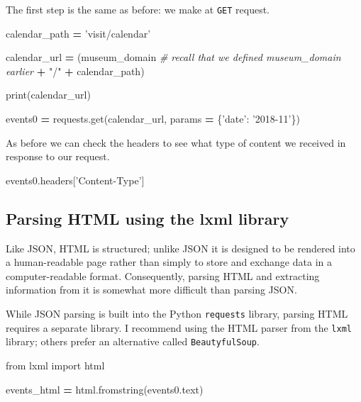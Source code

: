 \documentclass[]{book}
\newenvironment{Shaded}{\begin{snugshade}}{\end{snugshade}}
\newcommand{\StringTok}[1]{\textcolor[rgb]{0.31,0.60,0.02}{#1}}
\newcommand{\ImportTok}[1]{#1}
\newcommand{\CommentTok}[1]{\textcolor[rgb]{0.56,0.35,0.01}{\textit{#1}}}
\newcommand{\OperatorTok}[1]{\textcolor[rgb]{0.81,0.36,0.00}{\textbf{#1}}}
\newcommand{\BuiltInTok}[1]{#1}
\newcommand{\NormalTok}[1]{#1}
\begin{document}
The first step is the same as before: we make at \texttt{GET} request.

\begin{Shaded}
\begin{Highlighting}[]
\NormalTok{calendar_path }\OperatorTok{=} \StringTok{'visit/calendar'}

\NormalTok{calendar_url }\OperatorTok{=}\NormalTok{ (museum_domain }\CommentTok{# recall that we defined museum_domain earlier}
                  \OperatorTok{+} \StringTok{"/"}
                  \OperatorTok{+}\NormalTok{ calendar_path)}

\BuiltInTok{print}\NormalTok{(calendar_url)}

\NormalTok{events0 }\OperatorTok{=}\NormalTok{ requests.get(calendar_url, params }\OperatorTok{=}\NormalTok{ \{}\StringTok{'date'}\NormalTok{: }\StringTok{'2018-11'}\NormalTok{\})}
\end{Highlighting}
\end{Shaded}

As before we can check the headers to see what type of content we
received in response to our request.

\begin{Shaded}
\begin{Highlighting}[]
\NormalTok{events0.headers[}\StringTok{'Content-Type'}\NormalTok{]}
\end{Highlighting}
\end{Shaded}

\subsection{Parsing HTML using the lxml
library}\label{parsing-html-using-the-lxml-library}

Like JSON, HTML is structured; unlike JSON it is designed to be rendered
into a human-readable page rather than simply to store and exchange data
in a computer-readable format. Consequently, parsing HTML and extracting
information from it is somewhat more difficult than parsing JSON.

While JSON parsing is built into the Python \texttt{requests} library,
parsing HTML requires a separate library. I recommend using the HTML
parser from the \texttt{lxml} library; others prefer an alternative
called \texttt{BeautyfulSoup}.

\begin{Shaded}
\begin{Highlighting}[]
\ImportTok{from}\NormalTok{ lxml }\ImportTok{import}\NormalTok{ html}

\NormalTok{events_html }\OperatorTok{=}\NormalTok{ html.fromstring(events0.text)}
\end{Highlighting}
\end{Shaded}
\end{document}
